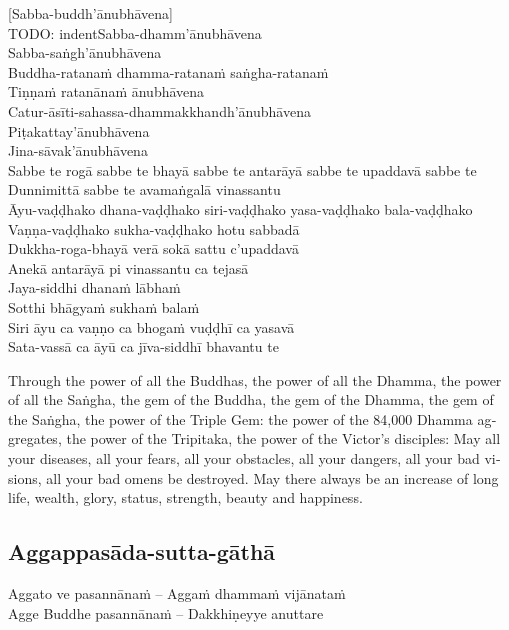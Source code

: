 [Sabba-buddh'ānubhāvena]\\
TODO: indentSabba-dhamm'ānubhāvena\\
Sabba-saṅgh'ānubhāvena\\
Buddha-ratanaṁ dhamma-ratanaṁ saṅgha-ratanaṁ\\
Tiṇṇaṁ ratanānaṁ ānubhāvena\\
Catur-āsīti-sahassa-dhammakkhandh'ānubhāvena\\
Piṭakattay'ānubhāvena\\
Jina-sāvak'ānubhāvena\\
Sabbe te rogā sabbe te bhayā sabbe te antarāyā sabbe te upaddavā sabbe te\\
Dunnimittā sabbe te avamaṅgalā vinassantu\\
Āyu-vaḍḍhako dhana-vaḍḍhako siri-vaḍḍhako yasa-vaḍḍhako bala-vaḍḍhako\\
Vaṇṇa-vaḍḍhako sukha-vaḍḍhako hotu sabbadā\\
Dukkha-roga-bhayā verā sokā sattu c'upaddavā\\
Anekā antarāyā pi vinassantu ca tejasā\\
Jaya-siddhi dhanaṁ lābhaṁ\\
Sotthi bhāgyaṁ sukhaṁ balaṁ\\
Siri āyu ca vaṇṇo ca bhogaṁ vuḍḍhī ca yasavā\\
Sata-vassā ca āyū ca jīva-siddhī bhavantu te

\begin{english}
  Through the power of all the Buddhas, the power of all the Dhamma, the power of all the Saṅgha, the gem of the Buddha, the gem of the Dhamma, the gem of the Saṅgha, the power of the Triple Gem: the power of the 84,000 Dhamma aggregates, the power of the Tripitaka, the power of the Victor's disciples: May all your diseases, all your fears, all your obstacles, all your dangers, all your bad visions, all your bad omens be destroyed. May there always be an increase of long life, wealth, glory, status, strength, beauty and happiness.
\end{english}

\suttaRef{[MJG]}

\subsection{Aggappasāda-sutta-gāthā}
\label{aggappasada-sutta-gatha}

\begin{twochants}
  Aggato ve pasannānaṁ – Aggaṁ dhammaṁ vijānataṁ\\
  Agge Buddhe pasannānaṁ – Dakkhiṇeyye anuttare
\end{twochants}

